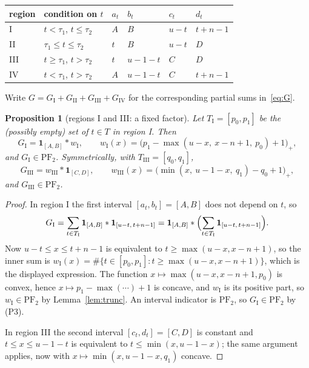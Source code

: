 \documentclass[11pt]{article}
\theoremstyle{plain}
\newtheorem{proposition}[theorem]{Proposition}
\theoremstyle{definition}
\newcommand{\PFtwo}{\mathrm{PF}_2}
\begin{document}
\begin{center}
\begin{tabular}{llllll}
\hline
region & condition on $t$ & $a_t$ & $b_t$ & $c_t$ & $d_t$\\
\hline
I   & $t<\tau_1$, $t\le\tau_2$ & $A$ & $B$ & $u-t$ & $t+n-1$\\
II  & $\tau_1\le t\le\tau_2$   & $t$ & $B$ & $u-t$ & $D$\\
III & $t\ge\tau_1$, $t>\tau_2$ & $t$ & $u-1-t$ & $C$ & $D$\\
IV  & $t<\tau_1$, $t>\tau_2$   & $A$ & $u-1-t$ & $C$ & $t+n-1$\\
\hline
\end{tabular}
\end{center}

Write $G=G_{\mathrm I}+G_{\mathrm{II}}+G_{\mathrm{III}}+G_{\mathrm{IV}}$ for the
corresponding partial sums in~\eqref{eq:G}.

\begin{proposition}[regions I and III: a fixed factor]\label{prop:regI}
Let $T_{\mathrm I}=[p_0,p_1]$ be the (possibly empty) set of $t\in T$ in region I. Then
\[
  G_{\mathrm I}=\mathbf 1_{[A,B]}*w_{\mathrm I},\qquad
  w_{\mathrm I}(x)=\bigl(p_1-\max(u-x,\ x-n+1,\ p_0)+1\bigr)_+ ,
\]
and $G_{\mathrm I}\in\PFtwo$. Symmetrically, with $T_{\mathrm{III}}=[q_0,q_1]$,
\[
  G_{\mathrm{III}}=w_{\mathrm{III}}*\mathbf 1_{[C,D]},\qquad
  w_{\mathrm{III}}(x)=\bigl(\min(x,\ u-1-x,\ q_1)-q_0+1\bigr)_+ ,
\]
and $G_{\mathrm{III}}\in\PFtwo$.
\end{proposition}
\begin{proof}
In region I the first interval $[a_t,b_t]=[A,B]$ does not depend on $t$, so
\[
 G_{\mathrm I}=\sum_{t\in T_{\mathrm I}}\mathbf 1_{[A,B]}*\mathbf 1_{[u-t,\,t+n-1]}
  =\mathbf 1_{[A,B]}*\Bigl(\sum_{t\in T_{\mathrm I}}\mathbf 1_{[u-t,\,t+n-1]}\Bigr).
\]
Now $u-t\le x\le t+n-1$ is equivalent to $t\ge\max(u-x,x-n+1)$, so the inner sum is
$w_{\mathrm I}(x)=\#\{t\in[p_0,p_1]: t\ge\max(u-x,x-n+1)\}$, which is the displayed
expression. The function $x\mapsto\max(u-x,x-n+1,p_0)$ is convex, hence
$x\mapsto p_1-\max(\cdots)+1$ is concave, and $w_{\mathrm I}$ is its positive part, so
$w_{\mathrm I}\in\PFtwo$ by Lemma~\ref{lem:trunc}. An interval indicator is $\PFtwo$, so
$G_{\mathrm I}\in\PFtwo$ by (P3).

In region III the second interval $[c_t,d_t]=[C,D]$ is constant and $t\le x\le u-1-t$ is
equivalent to $t\le\min(x,u-1-x)$; the same argument applies, now with
$x\mapsto\min(x,u-1-x,q_1)$ concave.
\end{proof}
\end{document}

